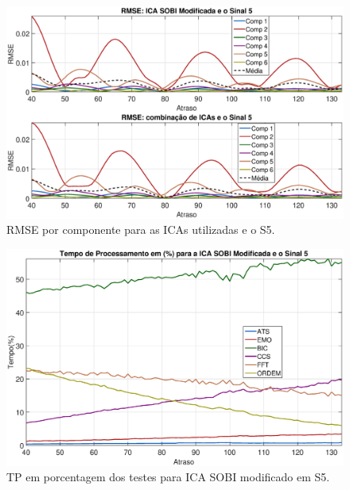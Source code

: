 \documentclass[a4paper,12pt]{monografia}
\theoremstyle{plain}
\theoremstyle{definition}
\theoremstyle{remark}
\begin{document}
\begin{figure}[!htb]
    \begin{center}
    \advance\leftskip -1.5cm
    \includegraphics[scale=0.45]{imagens/ImagensParaOAnexo/RMSEcompATodasICAsSinal5.eps}
    \caption{RMSE por componente para as ICAs utilizadas e o S5.}
    \label{fig:RMSEAS5}    
    \end{center}
\end{figure}

\begin{figure}[!htb]
    \begin{center}
    \advance\leftskip -1.5cm
    \includegraphics[scale=0.45]{imagens/ImagensParaOAnexo/TPPAICASOBImodSinal5.eps}
    \caption{TP em porcentagem dos testes para ICA SOBI modificado em S5.}
    \label{fig:TPSMAS5}    
    \end{center}
\end{figure}
\end{document}

